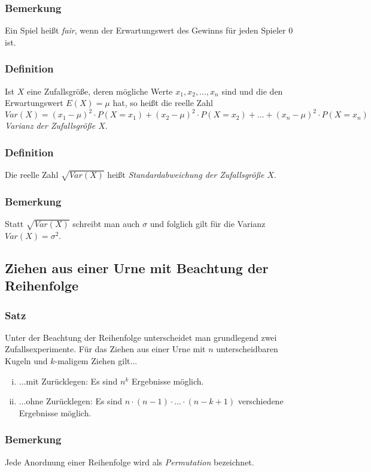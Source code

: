 \documentclass[a4paper,12pt]{article}
\begin{document}
\subsubsection{Bemerkung}
Ein Spiel heißt \emph{fair}, wenn der Erwartungswert des Gewinns für jeden Spieler 0 ist.


\subsubsection{Definition}
Ist $X$ eine Zufallsgröße, deren mögliche Werte $x_1, x_2,..., x_n$ sind und die den Erwartungswert $E(X)=\mu$ hat, so heißt die reelle Zahl $Var(X)=(x_1-\mu)^2\cdot P(X=x_1)+(x_2-\mu)^2 \cdot P(X=x_2)+ ... + (x_n-\mu )^2 \cdot P(X=x_n)$ \emph{Varianz der Zufallsgröße $X$}.

\subsubsection{Definition}
Die reelle Zahl $\sqrt{Var(X)}$ heißt \emph{Standardabweichung der Zufallsgröße $X$}.

\subsubsection{Bemerkung}
Statt $\sqrt{Var(X)}$ schreibt man auch $\sigma$ und folglich gilt für die Varianz $Var(X)=\sigma^2$.

\subsection{Ziehen aus einer Urne mit Beachtung der Reihenfolge}
\subsubsection{Satz}
Unter der Beachtung der Reihenfolge unterscheidet man grundlegend zwei Zufallsexperimente. Für das Ziehen aus einer Urne mit $n$ unterscheidbaren Kugeln und $k$-maligem Ziehen gilt...
\begin{enumerate}[(i)]
\item ...mit Zurücklegen: Es sind $n^k$ Ergebnisse möglich. 
\item ...ohne Zurücklegen: Es sind $n\cdot (n-1)\cdot ... \cdot (n-k+1)$ verschiedene Ergebnisse möglich. 
\end{enumerate}

\subsubsection{Bemerkung}
Jede Anordnung einer Reihenfolge wird als \emph{Permutation} bezeichnet.
\end{document}
